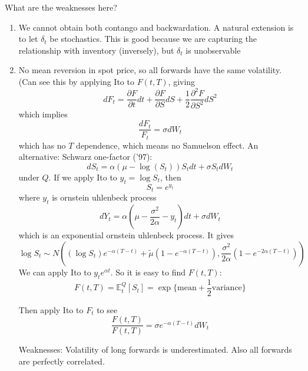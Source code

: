 \documentclass[twocolumn,openany]{book}
\begin{document}
What are the weaknesses here?
\begin{enumerate}
	\item We cannot obtain both contango and backwardation. A natural extension is to let $\delta_t$ be stochastics. This is good because we are capturing the relationship with inventory (inversely), but $\delta_t$ is unobservable
	\item No mean reversion in spot price, so all forwards have the same volatility. (Can see this by applying Ito to $F(t,T)$, giving
	\begin{equation}
		dF_t = \frac{\partial F}{\partial t}dt + \frac{\partial F}{\partial S}dS + \frac12 \frac{\partial^2 F}{\partial S^2} dS^2
	\end{equation}
	which implies
	\begin{equation}
		\frac{dF_t}{F_t} = \sigma dW_t
	\end{equation}
	which has no $T$ dependence, which means no Samuelson effect.
	An alternative: Schwarz one-factor ('97):
	\begin{equation}
		dS_t = \alpha(\mu - \log(S_t))S_tdt + \sigma S_t dW_t
	\end{equation}
	under $Q$. If we apply Ito to $y_t = \log S_t$, then
	\begin{equation}
		S_t = e^{y_t}
	\end{equation}
	where $y_t$ is ornstein uhlenbeck process
	\begin{equation}
		dY_t = \alpha(\mu - \frac{\sigma^2}{2\alpha} - y_t)dt + \sigma dW_t
	\end{equation}
	which is an exponential ornstein uhlenbeck process. It gives
	\begin{equation}
		\log S_t \sim N( (\log S_t) e^{-\alpha(T-t)} + \tilde{\mu}(1-e^{-\alpha(T-t)}) ,  \frac{\sigma^2}{2\alpha} (1-e^{-2\alpha(T-t)}))
	\end{equation}
	We can apply Ito to $y_te^{\alpha t}$. So it is easy to find $F(t,T)$:
	\begin{equation}
		F(t,T) = \mathbb{E}_t^Q\left[ S_t \right] = \exp \{ \text{mean} + \frac12 \text{variance} \}
	\end{equation}
	
	Then apply Ito to $F_t$ to see
	\begin{equation}
		\frac{F(t,T)}{F(t,T)} = \sigma e^{-\alpha(T-t)}dW_t
	\end{equation}
	
	Weaknesses: Volatility of long forwards is underestimated. Also all forwards are perfectly correlated.
\end{enumerate}
\end{document}

